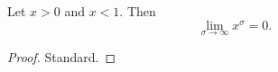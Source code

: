 \begin{lemma}
\label{tendsto_rpow_atTop_nhds_zero_of_norm_lt_one}
\leanok
Let $x>0$ and $x<1$. Then
  $$\lim_{\sigma\to\infty}x^\sigma=0.$$
\end{lemma}
\begin{proof}
\leanok
Standard.
\end{proof}
